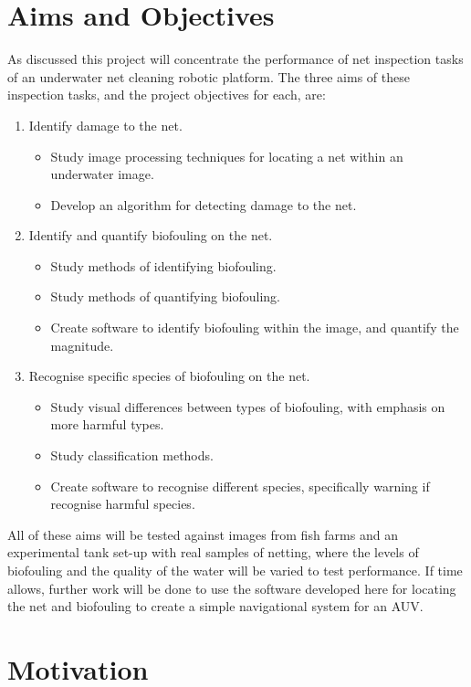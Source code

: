 \documentclass[11.5pt, twoside, a4paper]{article}
\begin{document}
\section{Aims and Objectives}
As discussed this project will concentrate the performance of net inspection tasks of an underwater net cleaning robotic platform. The three aims of these inspection tasks, and the project objectives for each, are:
\begin{enumerate}
\item Identify damage to the net.
\begin{itemize}
\item Study image processing techniques for locating a net within an underwater image.
\item Develop an algorithm for detecting damage to the net.
\end{itemize}
\item Identify and quantify biofouling on the net.
\begin{itemize}
\item Study methods of identifying biofouling. %
\item Study methods of quantifying biofouling.
\item Create software to identify biofouling within the image, and quantify the magnitude.
\end{itemize}
\item Recognise specific species of biofouling on the net.
\begin{itemize}
\item Study visual differences between types of biofouling, with emphasis on more harmful types.
\item Study classification methods.
\item Create software to recognise different species, specifically warning if recognise harmful species.
\end{itemize}
\end{enumerate}
All of these aims will be tested against images from fish farms and an experimental tank set-up with real samples of netting, where the levels of biofouling and the quality of the water will be varied to test performance. If time allows, further work will be done to use the software developed here for locating the net and biofouling to create a simple navigational system for an AUV.

\section{Motivation}
\end{document}
